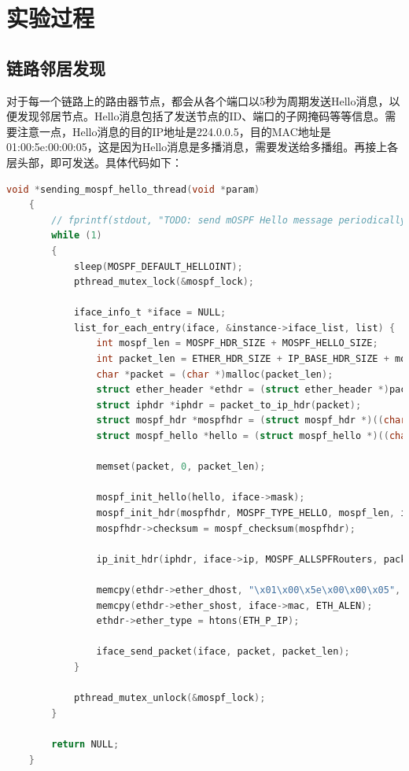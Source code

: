 \documentclass[UTF8]{report}
\begin{document}
\section{实验过程}

\subsection{链路邻居发现}

对于每一个链路上的路由器节点，都会从各个端口以5秒为周期发送Hello消息，以便发现邻居节点。Hello消息包括了发送节点的ID、端口的子网掩码等等信息。需要注意一点，Hello消息的目的IP地址是224.0.0.5，目的MAC地址是01:00:5e:00:00:05，这是因为Hello消息是多播消息，需要发送给多播组。再接上各层头部，即可发送。具体代码如下：

\begin{lstlisting}[language=C]
    void *sending_mospf_hello_thread(void *param)
    {
        // fprintf(stdout, "TODO: send mOSPF Hello message periodically.\n");
        while (1)
        {
            sleep(MOSPF_DEFAULT_HELLOINT);
            pthread_mutex_lock(&mospf_lock);
    
            iface_info_t *iface = NULL;
            list_for_each_entry(iface, &instance->iface_list, list) {
                int mospf_len = MOSPF_HDR_SIZE + MOSPF_HELLO_SIZE;
                int packet_len = ETHER_HDR_SIZE + IP_BASE_HDR_SIZE + mospf_len;
                char *packet = (char *)malloc(packet_len);
                struct ether_header *ethdr = (struct ether_header *)packet;
                struct iphdr *iphdr = packet_to_ip_hdr(packet);
                struct mospf_hdr *mospfhdr = (struct mospf_hdr *)((char *)iphdr + IP_BASE_HDR_SIZE);
                struct mospf_hello *hello = (struct mospf_hello *)((char *)mospfhdr + MOSPF_HDR_SIZE);
    
                memset(packet, 0, packet_len);
    
                mospf_init_hello(hello, iface->mask);
                mospf_init_hdr(mospfhdr, MOSPF_TYPE_HELLO, mospf_len, instance->router_id, instance->area_id);
                mospfhdr->checksum = mospf_checksum(mospfhdr);
    
                ip_init_hdr(iphdr, iface->ip, MOSPF_ALLSPFRouters, packet_len - ETHER_HDR_SIZE, IPPROTO_MOSPF);
    
                memcpy(ethdr->ether_dhost, "\x01\x00\x5e\x00\x00\x05", ETH_ALEN);
                memcpy(ethdr->ether_shost, iface->mac, ETH_ALEN);
                ethdr->ether_type = htons(ETH_P_IP);
    
                iface_send_packet(iface, packet, packet_len);
            }
    
            pthread_mutex_unlock(&mospf_lock);
        }
        
        return NULL;
    }
\end{lstlisting}
\end{document}
